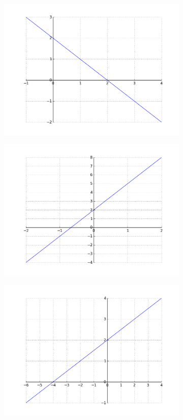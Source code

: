 \documentclass[12pt,twoside,onecolumn]{article}
\begin{document}
\begin{Exercise}
\begin{figure}[h!]
\begin{subfigure}{.5\textwidth}
    \includegraphics[scale = 0.5]{figures/mXp2.png}
    \end{subfigure}
    \begin{subfigure}{.5\textwidth}
    \centering
    \includegraphics[scale = 0.5]{figures/3Xp2.png}
    \end{subfigure}%
    \begin{subfigure}{.5\textwidth}
    \centering
    \includegraphics[scale = 0.5]{figures/05Xp2.png}

\end{subfigure}
\end{figure}
\end{Exercise}
\end{document}

